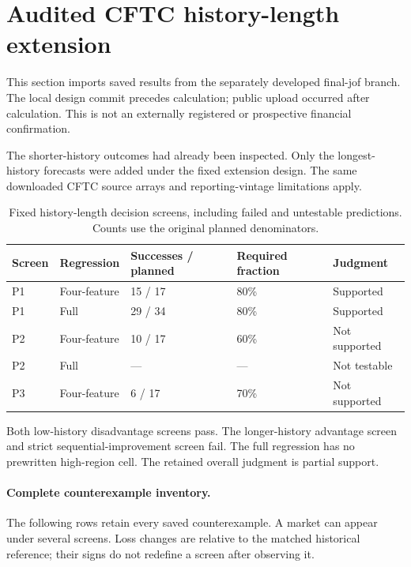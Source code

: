 \section{Audited CFTC history-length extension}\label{sup:submission-wp2}

This section imports saved results from the separately developed final-jof branch. The local design commit precedes calculation; public upload occurred after calculation. This is not an externally registered or prospective financial confirmation.

The shorter-history outcomes had already been inspected. Only the longest-history forecasts were added under the fixed extension design. The same downloaded CFTC source arrays and reporting-vintage limitations apply.

\begin{table}[htbp]\centering\small

\caption{Fixed history-length decision screens, including failed and untestable predictions. Counts use the original planned denominators.}\label{tab:submission-wp2}

\begin{tabular}{lllll}\toprule

Screen & Regression & Successes / planned & Required fraction & Judgment\\\midrule

P1 & Four-feature & 15 / 17 & 80\% & Supported\\

P1 & Full & 29 / 34 & 80\% & Supported\\

P2 & Four-feature & 10 / 17 & 60\% & Not supported\\

P2 & Full & --- & --- & Not testable\\

P3 & Four-feature & 6 / 17 & 70\% & Not supported\\

\bottomrule\end{tabular}\end{table}

Both low-history disadvantage screens pass. The longer-history advantage screen and strict sequential-improvement screen fail. The full regression has no prewritten high-region cell. The retained overall judgment is partial support.

\paragraph{Complete counterexample inventory.} The following rows retain every saved counterexample. A market can appear under several screens. Loss changes are relative to the matched historical reference; their signs do not redefine a screen after observing it.

